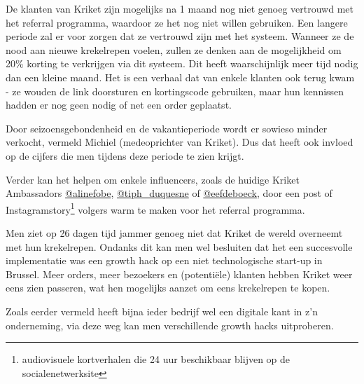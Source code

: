 De klanten van Kriket zijn mogelijks na 1 maand nog niet genoeg vertrouwd met het referral programma, waardoor ze het nog niet willen gebruiken. Een langere periode zal er voor zorgen dat ze vertrouwd zijn met het systeem. Wanneer ze de nood aan nieuwe krekelrepen voelen, zullen ze denken aan de mogelijkheid om 20\% korting te verkrijgen via dit systeem. Dit heeft waarschijnlijk meer tijd nodig dan een kleine maand. Het is een verhaal dat van enkele klanten ook terug kwam - ze wouden de link doorsturen en kortingscode gebruiken, maar hun kennissen hadden er nog geen nodig of net een order geplaatst. 

Door seizoensgebondenheid en de vakantieperiode wordt er sowieso minder verkocht, vermeld Michiel (medeoprichter van Kriket). Dus dat heeft ook invloed op de cijfers die men tijdens deze periode te zien krijgt.

Verder kan het helpen om enkele influencers, zoals de huidige Kriket Ambassadors \href{https://www.instagram.com/alinefobe}{@alinefobe}, \href{https://www.instagram.com/tiph_duquesne}{@tiph\_duquesne} of \href{https://www.instagram.com/eefdeboeck}{@eefdeboeck}, door een post of Instagramstory\footnote{audiovisuele kortverhalen die 24 uur beschikbaar blijven op de socialenetwerksite} volgers warm te maken voor het referral programma. 

Men ziet op 26 dagen tijd jammer genoeg niet dat Kriket de wereld overneemt met hun krekelrepen. Ondanks dit kan men wel besluiten dat het een succesvolle implementatie was een growth hack op een niet technologische start-up in Brussel. Meer orders, meer bezoekers en (potentiële) klanten hebben Kriket weer eens zien passeren, wat hen mogelijks aanzet om eens krekelrepen te kopen.

Zoals eerder vermeld heeft bijna ieder bedrijf wel een digitale kant in z'n onderneming, via deze weg kan men verschillende growth hacks uitproberen.



